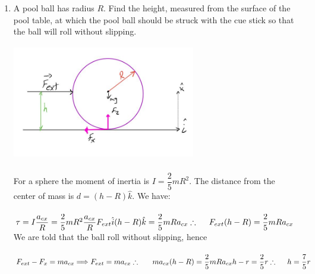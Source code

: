 \documentclass[fleqn]{article}
\begin{document}
\begin{enumerate}
    \pagebreak

    \item A pool ball has radius $R$. Find the height, measured from the surface of the pool table, at which the pool ball should be struck with the cue
    stick so that the ball will roll without slipping.

      \textcolor{hwColor}{
        \includegraphics[height=5cm, width=8cm]{Capture.JPG}
        \\
        \\
        For a sphere the moment of inertia is $I=\dfrac{2}{5} m R^2$. The distance from the center of mass
        is $d=(h-R)\hat{k}$. We have: \\
        \\
        $
          \tau=I \dfrac{a_{cx}}{R}=\dfrac{2}{5} m R^2 \dfrac{a_{cx}}{R}
          \\
          \\
          F_{ext} \hat{i} (h-R) \hat{k}=\dfrac{2}{5} mRa_{cx} 
          \\
          \\
          \\
          \therefore ~~~~ F_{ext}(h-R)=\dfrac{2}{5} mRa_{cx} 
        $
        We are told that the ball roll without slipping, hence 
        \\
        \\
        $
          F_{ext}-F_{x}=ma_{cx} \Longrightarrow F_{ext}=ma_{cx}
          \\
          \\
          \\
          \therefore ~~~~~ ma_{cx} (h-R)=\dfrac{2}{5} mRa_{cx} 
          \\
          \\
          h-r=\dfrac{2}{5} r
          \\
          \\
          \\
          \therefore ~~~~ h=\dfrac{7}{5} r
        $
      }


\end{enumerate}
\end{document}
